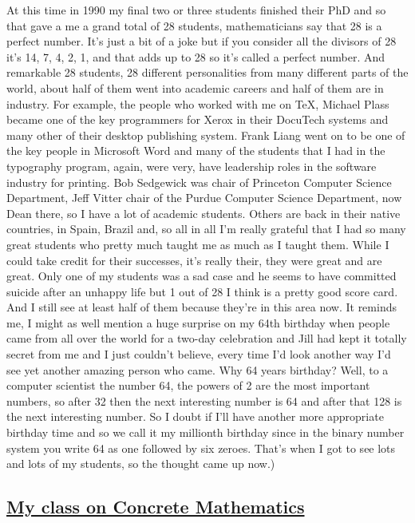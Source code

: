 \documentclass[]{article}
\begin{document}
At this time in 1990 my final two or three students finished their PhD
and so that gave a me a grand total of 28 students, mathematicians say
that 28 is a perfect number. It's just a bit of a joke but if you
consider all the divisors of 28 it's 14, 7, 4, 2, 1, and that adds up to
28 so it's called a perfect number. And remarkable 28 students, 28
different personalities from many different parts of the world, about
half of them went into academic careers and half of them are in
industry. For example, the people who worked with me on TeX, Michael
Plass became one of the key programmers for Xerox in their DocuTech
systems and many other of their desktop publishing system. Frank Liang
went on to be one of the key people in Microsoft Word and many of the
students that I had in the typography program, again, were very, have
leadership roles in the software industry for printing. Bob Sedgewick
was chair of Princeton Computer Science Department, Jeff Vitter chair of
the Purdue Computer Science Department, now Dean there, so I have a lot
of academic students. Others are back in their native countries, in
Spain, Brazil and, so all in all I'm really grateful that I had so many
great students who pretty much taught me as much as I taught them. While
I could take credit for their successes, it's really their, they were
great and are great. Only one of my students was a sad case and he seems
to have committed suicide after an unhappy life but 1 out of 28 I think
is a pretty good score card. And I still see at least half of them
because they're in this area now. It reminds me, I might as well mention
a huge surprise on my 64th birthday when people came from all over the
world for a two-day celebration and Jill had kept it totally secret from
me and I just couldn't believe, every time I'd look another way I'd see
yet another amazing person who came. Why 64 years birthday? Well, to a
computer scientist the number 64, the powers of 2 are the most important
numbers, so after 32 then the next interesting number is 64 and after
that 128 is the next interesting number. So I doubt if I'll have another
more appropriate birthday time and so we call it my millionth birthday
since in the binary number system you write 64 as one followed by six
zeroes. That's when I got to see lots and lots of my students, so the
thought came up now.)

\subsection{\texorpdfstring{\href{http://webofstories.com/play/17138}{My
class on Concrete
Mathematics}}{My class on Concrete Mathematics}}\label{my-class-on-concrete-mathematics}
\end{document}
